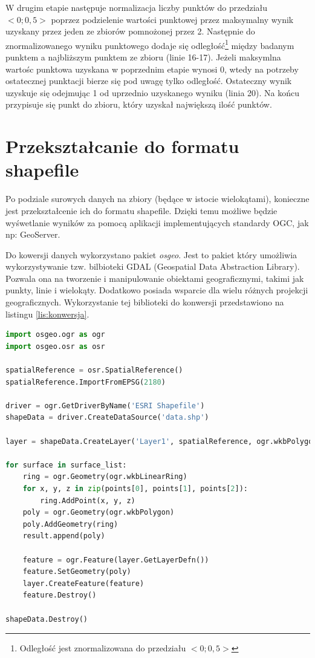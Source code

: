 W drugim etapie następuje normalizacja liczby punktów do przedziału $<0; 0,5>$ poprzez podzielenie wartości punktowej
przez maksymalny wynik uzyskany przez jeden ze zbiorów pomnożonej przez 2. Następnie do znormalizowanego wyniku punktowego
dodaje się odległość\footnote{Odległość jest znormalizowana do przedziału $<0; 0,5>$} 
między badanym punktem a najbliższym punktem ze zbioru (linie 16-17).
Jeżeli maksymlna wartośc punktowa uzyskana w poprzednim etapie wynosi 0, wtedy na potrzeby ostatecznej punktacji
bierze się pod uwagę tylko odległość. Ostateczny wynik uzyskuje się odejmując 1 od uprzednio uzyskanego wyniku (linia 20).
Na końcu przypisuje się punkt do zbioru, który uzyskał największą ilość punktów.

\section{Przekształcanie do formatu shapefile}

Po podziale surowych danych na zbiory (będące w istocie wielokątami), konieczne jest
przekształcenie ich do formatu shapefile. Dzięki temu możliwe będzie wyśwetlanie wyników
za pomocą aplikacji implementujących standardy OGC, jak np: GeoServer.

Do kowersji danych wykorzystano pakiet \textit{osgeo}. Jest to pakiet który umożliwia
wykorzystywanie tzw. bilbioteki GDAL (Geospatial Data Abstraction Library). Pozwala ona
na tworzenie i manipulowanie obiektami geograficznymi, takimi jak punkty, linie i wielokąty.
Dodatkowo posiada wsparcie dla wielu różnych projekcji geograficznych. Wykorzystanie tej
biblioteki do konwersji przedstawiono na listingu \ref{lis:konwersja}.

\begin{lstlisting}[frame=L, language=python, caption={Konwersja danych do formatu SHP}, label={lis:konwersja}]
import osgeo.ogr as ogr
import osgeo.osr as osr

spatialReference = osr.SpatialReference()
spatialReference.ImportFromEPSG(2180)

driver = ogr.GetDriverByName('ESRI Shapefile')
shapeData = driver.CreateDataSource('data.shp')

layer = shapeData.CreateLayer('Layer1', spatialReference, ogr.wkbPolygon)

for surface in surface_list:
	ring = ogr.Geometry(ogr.wkbLinearRing)
	for x, y, z in zip(points[0], points[1], points[2]):
	    ring.AddPoint(x, y, z)
	poly = ogr.Geometry(ogr.wkbPolygon)
	poly.AddGeometry(ring)
	result.append(poly)
	
	feature = ogr.Feature(layer.GetLayerDefn())
	feature.SetGeometry(poly)
	layer.CreateFeature(feature)
	feature.Destroy()

shapeData.Destroy()

\end{lstlisting}

